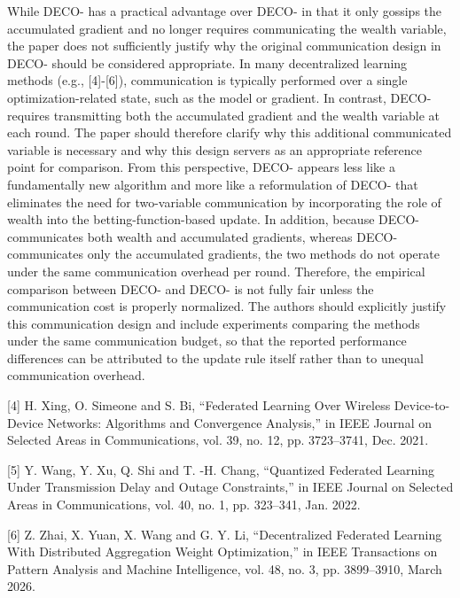 \documentclass[12pt,english]{reviewresponse}
\newcommand{\algname}{{DECO}\xspace}
\begin{document}
\begin{revcomment}[breakable]
    While \algname{}- has a practical advantage over \algname{}- in that it only gossips the accumulated gradient and no longer requires communicating the wealth variable, the paper does not sufficiently justify why the original communication design in \algname{}- should be considered appropriate. In many decentralized learning methods (e.g., [4]-[6]), communication is typically performed over a single optimization-related state, such as the model or gradient. In contrast, \algname{}- requires transmitting both the accumulated gradient and the wealth variable at each round. The paper should therefore clarify why this additional communicated variable is necessary and why this design servers as an appropriate reference point for comparison. From this perspective, \algname{}- appears less like a fundamentally new algorithm and more like a reformulation of \algname{}- that eliminates the need for two-variable communication by incorporating the role of wealth into the betting-function-based update. In addition, because \algname{}- communicates both wealth and accumulated gradients, whereas \algname{}- communicates only the accumulated gradients, the two methods do not operate under the same communication overhead per round. Therefore, the empirical comparison between \algname{}- and \algname{}- is not fully fair unless the communication cost is properly normalized. The authors should explicitly justify this communication design and include experiments comparing the methods under the same communication budget, so that the reported performance differences can be attributed to the update rule itself rather than to unequal communication overhead.

        [4] H. Xing, O. Simeone and S. Bi, \enquote{Federated Learning Over Wireless Device-to-Device Networks: Algorithms and Convergence Analysis,} in IEEE Journal on Selected Areas in Communications, vol. 39, no. 12, pp. 3723--3741, Dec. 2021.

        [5] Y. Wang, Y. Xu, Q. Shi and T. -H. Chang, \enquote{Quantized Federated Learning Under Transmission Delay and Outage Constraints,} in IEEE Journal on Selected Areas in Communications, vol. 40, no. 1, pp. 323--341, Jan. 2022.

        [6] Z. Zhai, X. Yuan, X. Wang and G. Y. Li, \enquote{Decentralized Federated Learning With Distributed Aggregation Weight Optimization,} in IEEE Transactions on Pattern Analysis and Machine Intelligence, vol. 48, no. 3, pp. 3899--3910, March 2026.
\end{revcomment}
\end{document}
